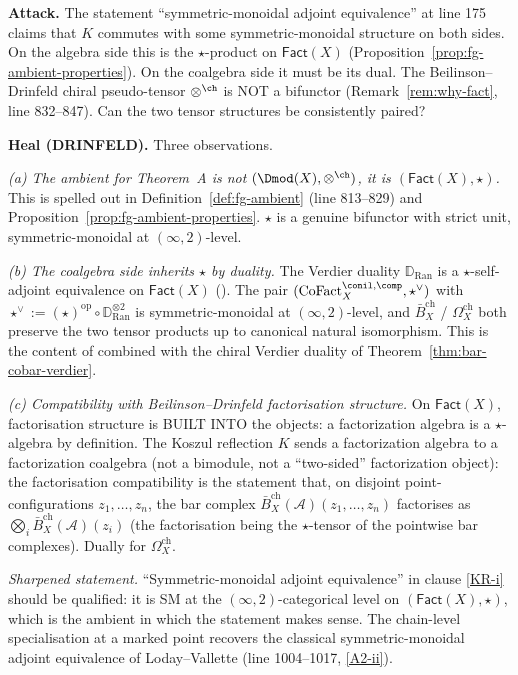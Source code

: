 \documentclass[11pt]{article}
\theoremstyle{definition}
\newcommand{\Bbarch}{\bar B^{\mathrm{ch}}}
\newcommand{\Omegach}{\Omega^{\mathrm{ch}}}
\newcommand{\Fact}{\mathsf{Fact}}
\newcommand{\Ran}{\mathrm{Ran}}
\newcommand{\cA}{\mathcal{A}}
\begin{document}
\textbf{Attack.} The statement ``symmetric-monoidal adjoint
equivalence'' at line 175 claims that $K$ commutes with some
symmetric-monoidal structure on both sides. On the algebra side this
is the $\star$-product on $\Fact(X)$ (Proposition~\ref{prop:fg-ambient-properties}).
On the coalgebra side it must be its dual. The Beilinson--Drinfeld
chiral pseudo-tensor $\otimes^{\ch}$ is NOT a bifunctor
(Remark~\ref{rem:why-fact}, line 832--847). Can the two tensor
structures be consistently paired?

\textbf{Heal (DRINFELD).} Three observations.

\emph{(a) The ambient for Theorem~A is not $(\Dmod(X),\otimes^{\ch})$,
it is $(\Fact(X),\star)$.} This is spelled out in
Definition~\ref{def:fg-ambient} (line 813--829) and Proposition~\ref{prop:fg-ambient-properties}.
$\star$ is a genuine bifunctor with strict unit, symmetric-monoidal
at $(\infty,2)$-level.

\emph{(b) The coalgebra side inherits $\star$ by duality.} The Verdier
duality $\mathbb{D}_{\Ran}$ is a $\star$-self-adjoint equivalence on
$\Fact(X)$ (\cite[IV.5, \S5.2]{GR17}). The pair
$(\mathrm{CoFact}^{\conil,\comp}_X,\star^\vee)$ with
$\star^\vee:=(\star)^{\mathrm{op}}\circ\mathbb{D}_{\Ran}^{\otimes 2}$
is symmetric-monoidal at $(\infty,2)$-level, and
$\Bbarch_X$ / $\Omegach_X$ both preserve the two tensor products up to
canonical natural isomorphism. This is the content of
\cite[\S4.2]{Francis2012} combined with the chiral Verdier duality
of Theorem~\ref{thm:bar-cobar-verdier}.

\emph{(c) Compatibility with Beilinson--Drinfeld factorisation
structure.} On $\Fact(X)$, factorisation structure is BUILT INTO
the objects: a factorization algebra is a $\star$-algebra by
definition. The Koszul reflection $K$ sends a factorization algebra
to a factorization coalgebra (not a bimodule, not a
``two-sided'' factorization object): the factorisation compatibility
is the statement that, on disjoint point-configurations $z_1,\ldots,z_n$,
the bar complex $\Bbarch_X(\cA)(z_1,\ldots,z_n)$ factorises as
$\bigotimes_i\Bbarch_X(\cA)(z_i)$ (the factorisation being the
$\star$-tensor of the pointwise bar complexes). Dually for
$\Omegach_X$.

\emph{Sharpened statement.} ``Symmetric-monoidal adjoint equivalence''
in clause \ref{KR-i} should be qualified: it is SM at the
$(\infty,2)$-categorical level on $(\Fact(X),\star)$, which is the
ambient in which the statement makes sense. The chain-level
specialisation at a marked point recovers the classical
symmetric-monoidal adjoint equivalence of Loday--Vallette (line
1004--1017, \ref{A2-ii}).
\end{document}
